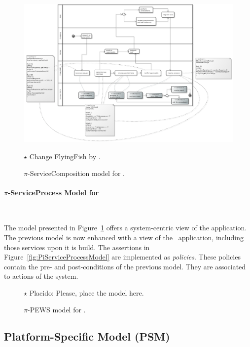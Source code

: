 \begin{figure}[t]
\centering
\includegraphics[width=1.0\textwidth]{figs/ServiceCompositionGeneralCut.png}
{\color{red} \raggedright
$\star$ Change FlyingFish by \FlyingPig.
}
\caption{$\pi$-ServiceComposition model for \FlyingPig.\label{fig:PiServiceCompositionModel}}
\end{figure}

\paragraph{\underline{$\pi$-ServiceProcess Model for \FlyingPig}}~

The model presented in Figure~\ref{fig:PiServiceCompositionModel} offers a system-centric view of the application.
The previous model is now enhanced with a view of the \FlyingPig\ application, including those services upon  it is build.
The assertions in Figure~\ref{fig:PiServiceProcessModel} are implemented as \textit{policies}.
These policies contain the pre- and post-conditions of the previous model.
They are associated to actions of the system.


\begin{figure}[t]
\centering

{\color{red} \raggedright
$\star$ Placido: Please, place the model here.
}
\caption{$\pi$-PEWS model for \FlyingPig.\label{fig:PiPEWSModel}}
\end{figure}

\subsection{Platform-Specific Model (PSM)}


